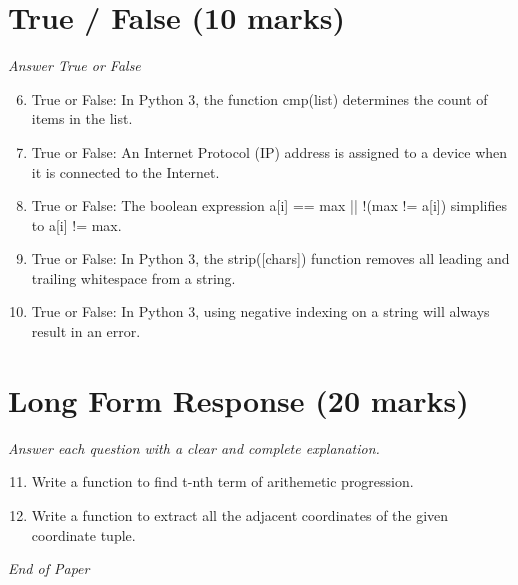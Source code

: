 \documentclass[12pt]{article}
\begin{document}
\section*{True / False (10 marks)}
\textit{Answer True or False}
\begin{enumerate}[label=\arabic*.]
\setcounter{enumi}{5}
\item True or False: In Python 3, the function cmp(list) determines the count of items in the list.
\item True or False: An Internet Protocol (IP) address is assigned to a device when it is connected to the Internet.
\item True or False: The boolean expression a[i] == max || !(max != a[i]) simplifies to a[i] != max.
\item True or False: In Python 3, the strip([chars]) function removes all leading and trailing whitespace from a string.
\item True or False: In Python 3, using negative indexing on a string will always result in an error.
\end{enumerate}

\section*{Long Form Response (20 marks)}
\textit{Answer each question with a clear and complete explanation.}
\begin{enumerate}[label=\arabic*.]
\setcounter{enumi}{10}
\item Write a function to find t-nth term of arithemetic progression.
\item Write a function to extract all the adjacent coordinates of the given coordinate tuple.
\end{enumerate}

\vfill
\noindent\textit{End of Paper}
\end{document}
